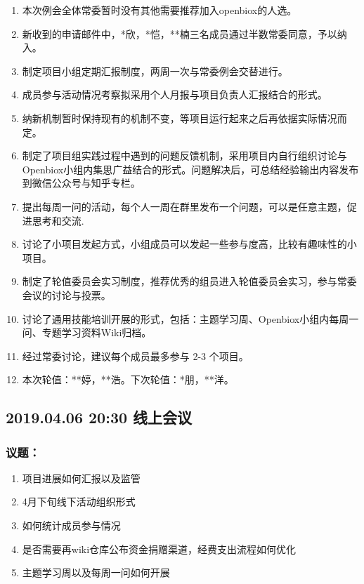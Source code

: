 \documentclass[]{article}
\providecommand{\tightlist}{%
  \setlength{\itemsep}{0pt}\setlength{\parskip}{0pt}}
\begin{document}
\begin{enumerate}
\def\labelenumi{\arabic{enumi}.}
\tightlist
\item
  本次例会全体常委暂时没有其他需要推荐加入openbiox的人选。
\item
  新收到的申请邮件中，*欣，*恺，**楠三名成员通过半数常委同意，予以纳入。
\item
  制定项目小组定期汇报制度，两周一次与常委例会交替进行。
\item
  成员参与活动情况考察拟采用个人月报与项目负责人汇报结合的形式。
\item
  纳新机制暂时保持现有的机制不变，等项目运行起来之后再依据实际情况而定。
\item
  制定了项目组实践过程中遇到的问题反馈机制，采用项目内自行组织讨论与Openbiox小组内集思广益结合的形式。问题解决后，可总结经验输出内容发布到微信公众号与知乎专栏。
\item
  提出每周一问的活动，每个人一周在群里发布一个问题，可以是任意主题，促进思考和交流.
\item
  讨论了小项目发起方式，小组成员可以发起一些参与度高，比较有趣味性的小项目。
\item
  制定了轮值委员会实习制度，推荐优秀的组员进入轮值委员会实习，参与常委会议的讨论与投票。
\item
  讨论了通用技能培训开展的形式，包括：主题学习周、Openbiox小组内每周一问、专题学习资料Wiki归档。
\item
  经过常委讨论，建议每个成员最多参与 2-3 个项目。
\item
  本次轮值：**婷，**浩。下次轮值：*朋，**洋。
\end{enumerate}

\subsection{2019.04.06 20:30 线上会议}\label{-2}

\subsubsection{议题：}

\begin{enumerate}
\def\labelenumi{\arabic{enumi}.}
\tightlist
\item
  项目进展如何汇报以及监管
\item
  4月下旬线下活动组织形式
\item
  如何统计成员参与情况
\item
  是否需要再wiki仓库公布资金捐赠渠道，经费支出流程如何优化
\item
  主题学习周以及每周一问如何开展
\end{enumerate}
\end{document}
